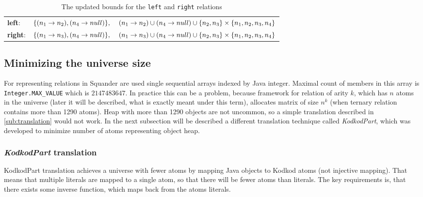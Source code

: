\documentclass[11pt,twoside,a4paper]{book}
\begin{document}
\begin{table}[ht]
\begin{center}
\begin{tabular}{ l l }
	\textbf{left}: &
	$\{(n_1\rightarrow
	n_2),(n_4 \rightarrow
	null)\},\hspace{4mm}(n_1 \rightarrow n_2)\cup(n_4 \rightarrow
	null)\cup \{n_2,n_3\}\times\{n_1,n_2,n_3,n_4\}$\\ 
	\textbf{right}: &
	$\{(n_1\rightarrow
	n_3),(n_4 \rightarrow
	null)\},\hspace{4mm}(n_1 \rightarrow n_3)\cup(n_4 \rightarrow
	null)\cup \{n_2,n_3\}\times\{n_1,n_2,n_3,n_4\}$\\
	
\end{tabular}
\end{center}
\caption{The updated bounds for the \texttt{left} and \texttt{right} relations}
\label{fig:updatedBounds}
\end{table}

\subsection{Minimizing the universe size}
For representing relations in Squander are used single sequential arrays indexed
by Java integer. Maximal count of members in this array is \verb|Integer.MAX_VALUE| which is
$2147483647$. In practice this can be a problem, because framework for relation
of arity $k$, which has $n$ atoms in the universe (later it will be described,
what is exactly meant under this term), allocates matrix of size $n^k$ (when
ternary relation contains more than 1290 atoms). Heap with more than 1290
objects are not uncommon, so a simple translation described in
\ref{sub:translation} would not work. In the next subsection will be described a
different translation technique called \textit{KodkodPart}, which was developed
to minimize number of atoms representing object heap.

\subsubsection{\textit{KodkodPart} translation}
\label{sub:kodkodpart}
KodkodPart translation achieves a universe with fewer atoms by mapping
Java objects to Kodkod atoms (not injective mapping). That means that multiple
literals are mapped to a single atom, so that there will be fewer atoms than
literals. The key requirements is, that there exists some inverse function,
which maps back from the atoms literals.
\end{document}

